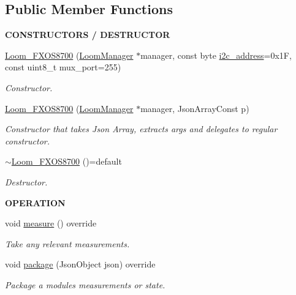 \subsection*{Public Member Functions}
\begin{Indent}{\bf C\+O\+N\+S\+T\+R\+U\+C\+T\+O\+RS / D\+E\+S\+T\+R\+U\+C\+T\+OR}\par
\begin{DoxyCompactItemize}
\item 
\hyperlink{class_loom___f_x_o_s8700_a6a10becd7fa45862d22c85877270d125}{Loom\+\_\+\+F\+X\+O\+S8700} (\hyperlink{class_loom_manager}{Loom\+Manager} $\ast$manager, const byte \hyperlink{class_loom_i2_c_sensor_a6ff389c1f015152a9ebfccb037d3d90e}{i2c\+\_\+address}=0x1\+F, const uint8\+\_\+t mux\+\_\+port=255)
\begin{DoxyCompactList}\small\item\em Constructor. \end{DoxyCompactList}\item 
\hyperlink{class_loom___f_x_o_s8700_ac13606da525090806dd3e3280b202f42}{Loom\+\_\+\+F\+X\+O\+S8700} (\hyperlink{class_loom_manager}{Loom\+Manager} $\ast$manager, Json\+Array\+Const p)
\begin{DoxyCompactList}\small\item\em Constructor that takes Json Array, extracts args and delegates to regular constructor. \end{DoxyCompactList}\item 
\hyperlink{class_loom___f_x_o_s8700_a08916794a586281e6ef014b7133dd5be}{$\sim$\+Loom\+\_\+\+F\+X\+O\+S8700} ()=default
\begin{DoxyCompactList}\small\item\em Destructor. \end{DoxyCompactList}\end{DoxyCompactItemize}
\end{Indent}
\begin{Indent}{\bf O\+P\+E\+R\+A\+T\+I\+ON}\par
\begin{DoxyCompactItemize}
\item 
void \hyperlink{class_loom___f_x_o_s8700_a229aa45f587d891327e1c2e87d869983}{measure} () override
\begin{DoxyCompactList}\small\item\em Take any relevant measurements. \end{DoxyCompactList}\item 
void \hyperlink{class_loom___f_x_o_s8700_a0418ea42d1c8764de9a152a4fae96c40}{package} (Json\+Object json) override
\begin{DoxyCompactList}\small\item\em Package a modules measurements or state. \end{DoxyCompactList}\end{DoxyCompactItemize}
\end{Indent}

